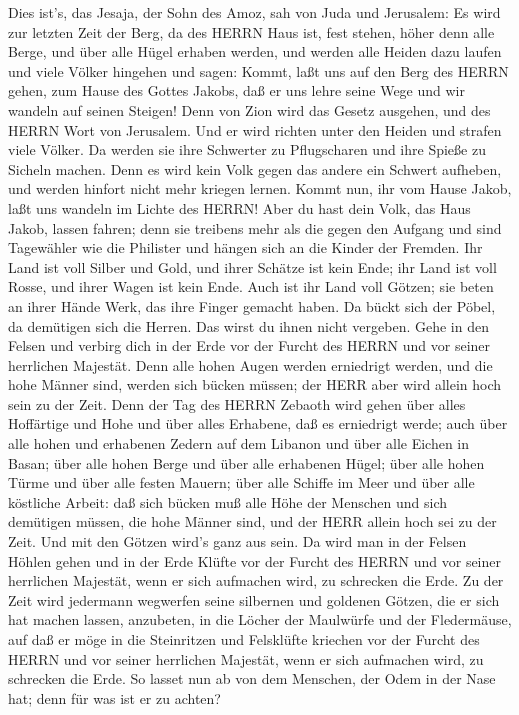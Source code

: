  Dies ist's, das Jesaja, der Sohn des Amoz, sah von Juda und
Jerusalem:  Es wird zur letzten Zeit der Berg, da des HERRN
Haus ist, fest stehen, höher denn alle Berge, und über alle Hügel
erhaben werden, und werden alle Heiden dazu laufen  und
viele Völker hingehen und sagen: Kommt, laßt uns auf den Berg des HERRN
gehen, zum Hause des Gottes Jakobs, daß er uns lehre seine Wege und wir
wandeln auf seinen Steigen! Denn von Zion wird das Gesetz ausgehen, und
des HERRN Wort von Jerusalem.  Und er wird richten unter den
Heiden und strafen viele Völker. Da werden sie ihre Schwerter zu
Pflugscharen und ihre Spieße zu Sicheln machen. Denn es wird kein Volk
gegen das andere ein Schwert aufheben, und werden hinfort nicht mehr
kriegen lernen.  Kommt nun, ihr vom Hause Jakob, laßt uns
wandeln im Lichte des HERRN!  Aber du hast dein Volk, das
Haus Jakob, lassen fahren; denn sie treibens mehr als die gegen den
Aufgang und sind Tagewähler wie die Philister und hängen sich an die
Kinder der Fremden.  Ihr Land ist voll Silber und Gold, und
ihrer Schätze ist kein Ende; ihr Land ist voll Rosse, und ihrer Wagen
ist kein Ende.  Auch ist ihr Land voll Götzen; sie beten an
ihrer Hände Werk, das ihre Finger gemacht haben.  Da bückt
sich der Pöbel, da demütigen sich die Herren. Das wirst du ihnen nicht
vergeben.  Gehe in den Felsen und verbirg dich in der Erde
vor der Furcht des HERRN und vor seiner herrlichen Majestät.
 Denn alle hohen Augen werden erniedrigt werden, und die
hohe Männer sind, werden sich bücken müssen; der HERR aber wird allein
hoch sein zu der Zeit.  Denn der Tag des HERRN Zebaoth wird
gehen über alles Hoffärtige und Hohe und über alles Erhabene, daß es
erniedrigt werde;  auch über alle hohen und erhabenen
Zedern auf dem Libanon und über alle Eichen in Basan;  über
alle hohen Berge und über alle erhabenen Hügel;  über alle
hohen Türme und über alle festen Mauern;  über alle Schiffe
im Meer und über alle köstliche Arbeit:  daß sich bücken
muß alle Höhe der Menschen und sich demütigen müssen, die hohe Männer
sind, und der HERR allein hoch sei zu der Zeit.  Und mit
den Götzen wird's ganz aus sein.  Da wird man in der Felsen
Höhlen gehen und in der Erde Klüfte vor der Furcht des HERRN und vor
seiner herrlichen Majestät, wenn er sich aufmachen wird, zu schrecken
die Erde.  Zu der Zeit wird jedermann wegwerfen seine
silbernen und goldenen Götzen, die er sich hat machen lassen, anzubeten,
in die Löcher der Maulwürfe und der Fledermäuse,  auf daß
er möge in die Steinritzen und Felsklüfte kriechen vor der Furcht des
HERRN und vor seiner herrlichen Majestät, wenn er sich aufmachen wird,
zu schrecken die Erde.  So lasset nun ab von dem Menschen,
der Odem in der Nase hat; denn für was ist er zu achten?

